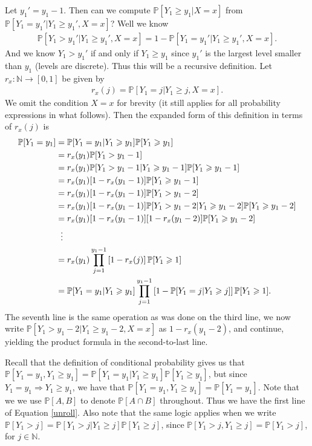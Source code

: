\documentclass[12pt, reqno]{amsart}
\theoremstyle{definition}
\theoremstyle{definition}
\theoremstyle{plain}
\theoremstyle{definition}
\theoremstyle{remark}
\newcommand{\n}{\mathbb{N}}				%
\newcommand{\bee}{\begin{equation}\begin{aligned}}
\newcommand{\eee}{\end{aligned}\end{equation}}
\newcommand{\lbrac}{\left[}				%
\newcommand{\rbrac}{\right]}
\renewcommand{\geq}{\geqslant}			%
\renewcommand{\'}{\hspace{0.5mm}'}			%
\begin{document}
Let $y_1' = y_1 - 1$. Then can we compute $\mathbb{P}[Y_1 \geq y_1|X = x]$ from $\mathbb{P}[Y_1 = y_1'|Y_1 \geq y_1', X = x]$? Well we know
\bee
	\mathbb{P}[Y_1 > y_1'|Y_1 \geq y_1', X = x] = 1 - \mathbb{P}[Y_1 = y_1'|Y_1 \geq y_1', X = x]. 
\eee
And we know $Y_1 > y_1'$ if and only if $Y_1 \geq y_1$ since $y_1'$ is the largest level smaller than $y_1$ (levels are discrete). Thus this will be a recursive definition. Let $r_x:\n \to [0,1]$ be given by
\bee
	r_x(j) = \mathbb{P}[Y_1 = j|Y_1 \geq j, X = x]. 
\eee
We omit the condition $X = x$ for brevity (it still applies for all probability expressions in what follows). Then the expanded form of this definition in terms of $r_x(j)$ is
\bee\label{unroll}
	\mathbb{P}[Y_1 = y_1]
	&=
		\mathbb{P}[Y_1 = y_1|Y_1 \geq y_1]
		\mathbb{P}[Y_1 \geq y_1]
		\\
	&=
		r_x(y_1)
		\mathbb{P}[Y_1 > y_1 - 1]
		\\
	&=
		r_x(y_1)
		\mathbb{P}[Y_1 > y_1 - 1|
		Y_1 \geq y_1 - 1]
		\mathbb{P}[Y_1 \geq y_1 - 1]
		\\
	&=
		r_x(y_1)
		[1 - r_x(y_1 - 1)]
		\mathbb{P}[Y_1 \geq y_1 - 1]
		\\
	&=
		r_x(y_1)
		[1 - r_x(y_1 - 1)]
		\mathbb{P}[Y_1 > y_1 - 2]
		\\
	&=
		r_x(y_1)
		[1 - r_x(y_1 - 1)]
		\mathbb{P}[Y_1 > y_1 - 2|
		Y_1 \geq y_1 - 2]
		\mathbb{P}[Y_1 \geq y_1 - 2]
		\\
	&=
		r_x(y_1)
		[1 - r_x(y_1 - 1)]
		[1 - r_x(y_1 - 2)]
		\mathbb{P}[Y_1 \geq y_1 - 2]
		\\
	&\hspace{2mm}\vdots \\
	&=
		r_x(y_1)
		\prod_{j = 1}^{y_1 - 1}
		\lbrac 
			1 - r_x(j)
		\rbrac 
		\mathbb{P}[Y_1 \geq 1]
		\\
	&=
		\mathbb{P}[Y_1 = y_1|Y_1 \geq y_1]
		\prod_{j = 1}^{y_1 - 1}
		\lbrac 
			1 - \mathbb{P}[Y_1 = j|Y_1 \geq j]
		\rbrac 
		\mathbb{P}[Y_1 \geq 1]. 
		\\
\eee
The seventh line is the same operation as was done on the third line, we now write $\mathbb{P}[Y_1 > y_1 - 2|Y_1 \geq y_1 - 2,X = x]$ as $1 - r_x(y_1 - 2)$, and continue, yielding the product formula in the second-to-last line. 

Recall that the definition of conditional probability gives us that $\mathbb{P}[Y_1 = y_1, Y_1 \geq y_1] = \mathbb{P}[Y_1 = y_1|Y_1 \geq y_1]\mathbb{P}[Y_1 \geq y_1]$, but since $Y_1 = y_1 \Rightarrow Y_1 \geq y_1$, we have that 
$\mathbb{P}[Y_1 = y_1, Y_1 \geq y_1] = \mathbb{P}[Y_1 = y_1]$. Note that we we use $\mathbb{P}[A,B]$ to denote $\mathbb{P}[A \cap B]$ throughout. Thus we have the first line of Equation \ref{unroll}. Also note that the same logic applies when we write $\mathbb{P}[Y_1 > j] = \mathbb{P}[Y_1 > j|Y_1 \geq j]\mathbb{P}[Y_1 \geq j]$, since $\mathbb{P}[Y_1 > j, Y_1 \geq j] = \mathbb{P}[Y_1 > j]$, for $j \in \n$. 
\end{document}
